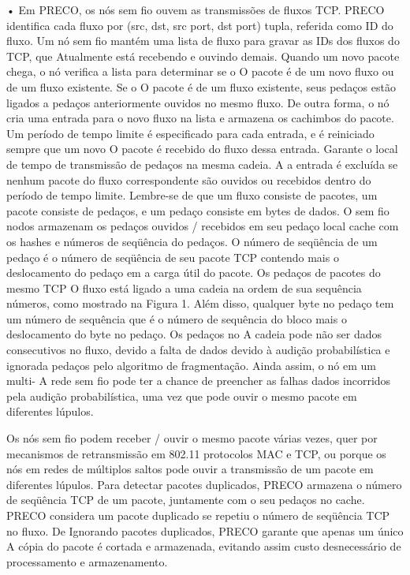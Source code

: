 \documentclass[12pt]{article}
\begin{document}
\begin{enumerate}
	• 
	Em PRECO,
	os nós sem fio ouvem as transmissões de fluxos TCP.
	PRECO identifica cada fluxo por (src, dst, src port, dst port)
	tupla, referida como ID do fluxo. Um nó sem fio mantém
	uma lista de fluxo para gravar as IDs dos fluxos do TCP, que
	Atualmente está recebendo e ouvindo demais. Quando um novo pacote
	chega, o nó verifica a lista para determinar se o
	O pacote é de um novo fluxo ou de um fluxo existente. Se o
	O pacote é de um fluxo existente, seus pedaços estão ligados a
	pedaços anteriormente ouvidos no mesmo fluxo. De outra forma,
	o nó cria uma entrada para o novo fluxo na lista
	e armazena os cachimbos do pacote. Um período de tempo limite é
	especificado para cada entrada, e é reiniciado sempre que um novo
	O pacote é recebido do fluxo dessa entrada. Garante o
	local de tempo de transmissão de pedaços na mesma cadeia. A
	a entrada é excluída se nenhum pacote do fluxo correspondente
	são ouvidos ou recebidos dentro do período de tempo limite.
	Lembre-se de que um fluxo consiste de pacotes, um pacote consiste
	de pedaços, e um pedaço consiste em bytes de dados. O sem fio
	nodos armazenam os pedaços ouvidos / recebidos em seu pedaço local
	cache com os hashes e números de seqüência do
	pedaços. O número de seqüência de um pedaço é o número de seqüência
	de seu pacote TCP contendo mais o deslocamento do pedaço em
	a carga útil do pacote. Os pedaços de pacotes do mesmo TCP
	O fluxo está ligado a uma cadeia na ordem de sua sequência
	números, como mostrado na Figura 1. Além disso, qualquer byte no pedaço
	tem um número de sequência que é o número de sequência do bloco
	mais o deslocamento do byte no pedaço. Os pedaços no
	A cadeia pode não ser dados consecutivos no fluxo, devido a
	falta de dados devido à audição probabilística e ignorada
	pedaços pelo algoritmo de fragmentação. Ainda assim, o nó em um multi-
	A rede sem fio pode ter a chance de preencher as falhas
	dados incorridos pela audição probabilística, uma vez que pode
	ouvir o mesmo pacote em diferentes lúpulos.
	
	Os nós sem fio podem receber / ouvir o mesmo pacote
	várias vezes, quer por mecanismos de retransmissão
	em 802.11 protocolos MAC e TCP, ou porque os nós
	em redes de múltiplos saltos pode ouvir a transmissão de
	um pacote em diferentes lúpulos. Para detectar pacotes duplicados,
	PRECO armazena o número de seqüência TCP de um pacote, juntamente com o seu
	pedaços no cache. PRECO considera um pacote duplicado
	se repetiu o número de seqüência TCP no fluxo. De
	Ignorando pacotes duplicados, PRECO garante que apenas um único
	A cópia do pacote é cortada e armazenada, evitando assim
	custo desnecessário de processamento e armazenamento.
	

	
	
\end{enumerate}
\end{document}
